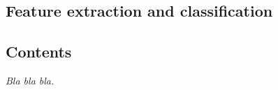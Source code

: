  \begin{titlepage}
    \vspace*{\fill}
      \part{Feature extraction and classification}
    \vspace*{\fill}
  \end{titlepage}

\startcontents[parts]

\chapter*{Contents}

\textit{Bla bla bla.}

\vspace{\baselineskip}


\pagebreak


\newpage


\stopcontents[parts]



